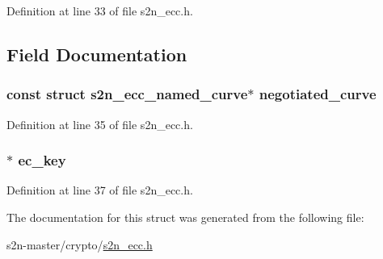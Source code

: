 Definition at line 33 of file s2n\+\_\+ecc.\+h.



\subsection{Field Documentation}
\subsubsection[{\texorpdfstring{negotiated\+\_\+curve}{negotiated_curve}}]{\setlength{\rightskip}{0pt plus 5cm}const struct {\bf s2n\+\_\+ecc\+\_\+named\+\_\+curve}$\ast$ negotiated\+\_\+curve}\hypertarget{structs2n__ecc__params_a1e0c49e3a87b8db6332443fcf0462468}{}\label{structs2n__ecc__params_a1e0c49e3a87b8db6332443fcf0462468}


Definition at line 35 of file s2n\+\_\+ecc.\+h.

\subsubsection[{\texorpdfstring{ec\+\_\+key}{ec_key}}]{$\ast$ ec\+\_\+key}\hypertarget{structs2n__ecc__params_a507c1731500e509e84bc42991cb6aea6}{}\label{structs2n__ecc__params_a507c1731500e509e84bc42991cb6aea6}


Definition at line 37 of file s2n\+\_\+ecc.\+h.



The documentation for this struct was generated from the following file\+:\begin{DoxyCompactItemize}
\item 
s2n-\/master/crypto/\hyperlink{s2n__ecc_8h}{s2n\+\_\+ecc.\+h}\end{DoxyCompactItemize}
